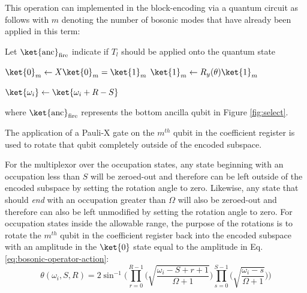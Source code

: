 This operation can implemented in the block-encoding via a quantum circuit as follows with $m$ denoting the number of bosonic modes that have already been applied in this term:
\begin{algorithmic}[1]
    \State Let $\ket{\text{anc}}_\text{fire}$ indicate if $T_l$ should be applied onto the quantum state
    

            \State $\ket{0}_m \gets X \ket{0}_m = \ket{1}_m$
                \State $\ket{1}_m \gets R_y(\theta) \ket{1}_m$
            \EndFor

            \State $\ket{\omega_i} \gets \ket{\omega_i + R - S}$
        \EndIf
    \EndFor
\end{algorithmic}
where $\ket{\text{anc}}_\text{fire}$ represents the bottom ancilla qubit in Figure \ref{fig:select}.

The application of a Pauli-X gate on the $m^{th}$ qubit in the coefficient register is used to rotate that qubit completely outside of the encoded subspace.

For the multiplexor over the occupation states, any state beginning with an occupation less than $S$ will be zeroed-out and therefore can be left outside of the encoded subspace by setting the rotation angle to zero.
Likewise, any state that should \textit{end} with an occupation greater than $\Omega$ will also be zeroed-out and therefore can also be left unmodified by setting the rotation angle to zero.
For occupation states inside the allowable range, the purpose of the rotations is to rotate the $m^{th}$ qubit in the coefficient register back into the encoded subspace with an amplitude in the $\ket{0}$ state equal to the amplitude in Eq. \ref{eq:bosonic-operator-action}:
\begin{equation}
    \label{eq:smarter-rot-angle}
    \theta(\omega_i, S, R) = 2 \sin^{-1}{\Big(\prod_{r=0}^{R-1} \big( \sqrt{\frac{\omega_i - S + r + 1}{\Omega + 1}} \big) \prod_{s=0}^{S-1} \big( \sqrt{\frac{\omega_i - s}{\Omega + 1}} \big)\Big)}
\end{equation}

